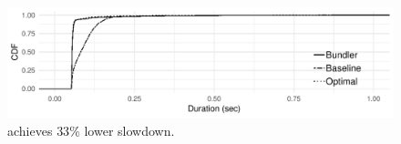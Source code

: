 \begin{figure}
    \centering
\begin{knitrout}
\color{fgcolor}
\includegraphics[width=\maxwidth]{figure/eval:best-1} 

\end{knitrout}
    \caption{\name achieves $33$\% lower slowdown.}
    \label{fig:eval:best}
\end{figure}
